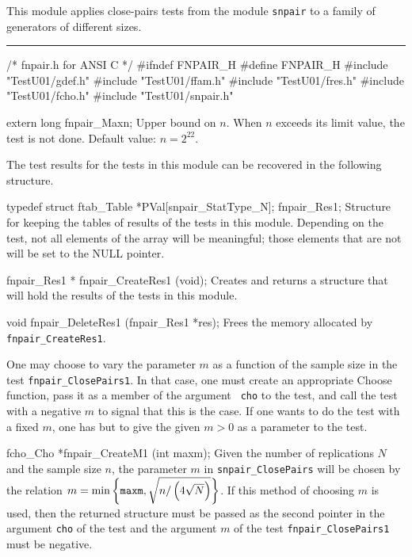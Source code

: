 
This module applies close-pairs tests from the module {\tt snpair}
to a family of generators of different sizes.

\bigskip
\hrule
\code\hide
/* fnpair.h  for ANSI C */
#ifndef FNPAIR_H
#define FNPAIR_H
\endhide
#include "TestU01/gdef.h"
#include "TestU01/ffam.h"
#include "TestU01/fres.h"
#include "TestU01/fcho.h"
#include "TestU01/snpair.h"


extern long fnpair_Maxn;
\endcode
\tab
  Upper bound on $n$.
  When $n$ exceeds its limit value, the test is not done.
  Default value: $n = 2^{22}$.
\endtab
\ifdetailed  %



The test results for the tests in this module can be recovered
in the following structure.

\code

typedef struct {
   ftab_Table *PVal[snpair_StatType_N];
} fnpair_Res1;
\endcode
 \tab
  Structure for keeping the tables of results of the tests in
  this module. Depending on the test, not all elements of the array
  will be meaningful; those elements that are not will be set to
  the NULL pointer.
 \endtab
\code


fnpair_Res1 * fnpair_CreateRes1 (void);
\endcode
 \tab
  Creates and returns a structure that will hold the results
  of the tests in this module.
 \endtab
\code


void fnpair_DeleteRes1 (fnpair_Res1 *res);
\endcode
 \tab
  Frees the memory allocated by {\tt fnpair\_CreateRes1}.
 \endtab

\fi    %



 One may choose to vary the parameter $m$ as a function of the sample size
in the test {\tt fnpair\_ClosePairs1}. In that case, one must create
 an appropriate Choose function, pass it as a member of the argument {\tt
cho} to the test,  and call the test with a negative $m$ to signal that
this is the case. If one wants to
 do the test with a fixed $m$, one has but to give the given $m> 0$ as a
parameter to the test.

\code


fcho_Cho *fnpair_CreateM1 (int maxm);
\endcode
 \tab
  Given the number of replications $N$  and the sample
  size $n$, the parameter $m$ in {\tt snpair\_Close\-Pairs} will be chosen
  by the relation
   $m = \min\left\{{\tt maxm},\sqrt{{n}/\left(4\sqrt{N}\right)}\right\}$.
  If this method
  of choosing $m$ is used, then  the returned structure must be passed as
  the second pointer in the argument {\tt cho} of the test and the
  argument $m$ of the test  {\tt fnpair\_ClosePairs1} must be negative.
 \endtab
\code


